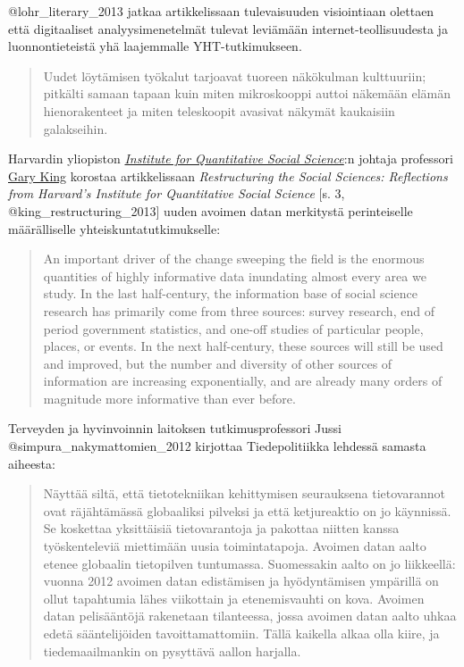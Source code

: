 @lohr\_literary\_2013 jatkaa artikkelissaan tulevaisuuden visiointiaan
olettaen että digitaaliset analyysimenetelmät tulevat leviämään
internet-teollisuudesta ja luonnontieteistä yhä laajemmalle
YHT-tutkimukseen.

\begin{quote}
Uudet löytämisen työkalut tarjoavat tuoreen näkökulman kulttuuriin;
pitkälti samaan tapaan kuin miten mikroskooppi auttoi näkemään elämän
hienorakenteet ja miten teleskoopit avasivat näkymät kaukaisiin
galakseihin.
\end{quote}

Harvardin yliopiston \href{http://www.iq.harvard.edu/}{\emph{Institute
for Quantitative Social Science}}:n johtaja professori
\href{http://gking.harvard.edu/}{Gary King} korostaa artikkelissaan
\emph{Restructuring the Social Sciences: Reflections from Harvard's
Institute for Quantitative Social Science} {[}s. 3,
@king\_restructuring\_2013{]} uuden avoimen datan merkitystä
perinteiselle määrälliselle yhteiskuntatutkimukselle:

\begin{quote}
An important driver of the change sweeping the field is the enormous
quantities of highly informative data inundating almost every area we
study. In the last half-century, the information base of social science
research has primarily come from three sources: survey research, end of
period government statistics, and one-off studies of particular people,
places, or events. In the next half-century, these sources will still be
used and improved, but the number and diversity of other sources of
information are increasing exponentially, and are already many orders of
magnitude more informative than ever before.
\end{quote}

Terveyden ja hyvinvoinnin laitoksen tutkimusprofessori Jussi
@simpura\_nakymattomien\_2012 kirjottaa Tiedepolitiikka lehdessä samasta
aiheesta:

\begin{quote}
Näyttää siltä, että tietotekniikan kehittymisen seurauksena
tietovarannot ovat räjähtämässä globaaliksi pilveksi ja että
ketjureaktio on jo käynnissä. Se koskettaa yksittäisiä tietovarantoja ja
pakottaa niitten kanssa työskenteleviä miettimään uusia toimintatapoja.
Avoimen datan aalto etenee globaalin tietopilven tuntumassa. Suomessakin
aalto on jo liikkeellä: vuonna 2012 avoimen datan edistämisen ja
hyödyntämisen ympärillä on ollut tapahtumia lähes viikottain ja
etenemisvauhti on kova. Avoimen datan pelisääntöjä rakenetaan
tilanteessa, jossa avoimen datan aalto uhkaa edetä sääntelijöiden
tavoittamattomiin. Tällä kaikella alkaa olla kiire, ja tiedemaailmankin
on pysyttävä aallon harjalla.
\end{quote}

